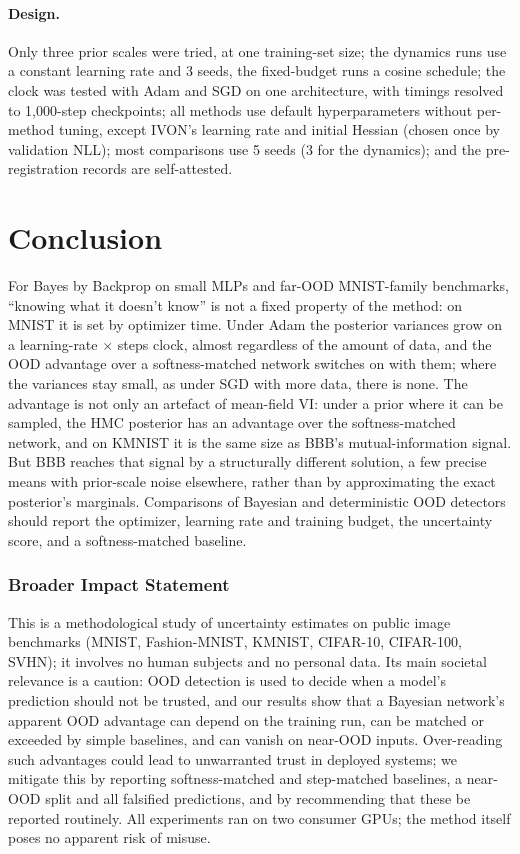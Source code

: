 \documentclass[10pt]{article}
\begin{document}
\paragraph{Design.} Only three prior scales were tried, at one training-set
size; the dynamics runs use a constant learning rate and 3 seeds, the
fixed-budget runs a cosine schedule; the clock was tested with Adam and SGD on
one architecture, with timings resolved to 1{,}000-step checkpoints; all
methods use default hyperparameters without per-method tuning, except IVON's
learning rate and initial Hessian (chosen once by validation NLL); most
comparisons use 5 seeds (3 for the dynamics); and the pre-registration records
are self-attested.

\section{Conclusion}
For Bayes by Backprop on small MLPs and far-OOD MNIST-family benchmarks,
``knowing what it doesn't know'' is not a fixed property of the method: on
MNIST it is set by optimizer time. Under Adam the posterior
variances grow on a learning-rate $\times$ steps clock, almost regardless of
the amount of data, and the OOD advantage over a softness-matched network
switches on with them; where the variances stay small, as under SGD with more
data, there is none. The advantage is not only an artefact of mean-field VI:
under a prior where it can be sampled, the HMC posterior has an advantage
over the softness-matched network, and on KMNIST it is the same size as BBB's
mutual-information signal. But BBB reaches that signal
by a structurally different solution, a few precise means with prior-scale
noise elsewhere, rather than by approximating the exact posterior's marginals.
Comparisons of Bayesian and deterministic OOD detectors should report the
optimizer, learning rate and training budget, the uncertainty score, and a
softness-matched baseline.

\subsubsection*{Broader Impact Statement}
This is a methodological study of uncertainty estimates on public image
benchmarks (MNIST, Fashion-MNIST, KMNIST, CIFAR-10, CIFAR-100, SVHN); it
involves no human subjects and no personal data. Its main societal relevance
is a caution: OOD detection is used to decide when a model's prediction should
not be trusted, and our results show that a Bayesian network's apparent OOD
advantage can depend on the training run, can be matched or exceeded by simple
baselines, and can vanish on near-OOD inputs. Over-reading such advantages could
lead to unwarranted trust in deployed systems; we mitigate this by reporting
softness-matched and step-matched baselines, a near-OOD split and all falsified
predictions, and by recommending that these be reported routinely. All
experiments ran on two consumer GPUs; the method itself poses no apparent
risk of misuse.
\end{document}
